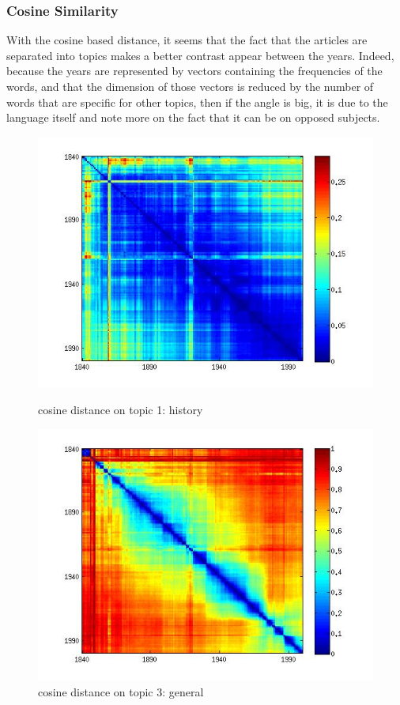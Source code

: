 \subsubsection{Cosine Similarity}

With the cosine based distance, it seems that the fact that the articles are separated into topics makes a better contrast appear between the years. Indeed, because the years are represented by vectors containing the frequencies of the words, and that the dimension of those vectors is reduced by the number of words that are specific for other topics, then if the angle is big, it is due to the language itself and note more on the fact that it can be on opposed subjects.

\begin{figure}[H]
    \begin{minipage}[b]{0.48\linewidth}
        \includegraphics[scale=0.3]{Pictures/topics/cos/topic1.jpg}
        \caption{cosine distance on topic 1: history}
        \label{cos_topic1}
    \end{minipage}\hfill
    \begin{minipage}[b]{0.5\linewidth}
        \includegraphics[scale=0.3]{Pictures/topics/cos/topic3.jpg}
        \caption{cosine distance on topic 3: general}
        \label{cos_topic3}
    \end{minipage}\hfill
\end{figure}

